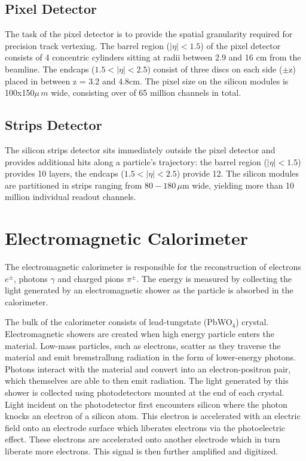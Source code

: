\subsection{Pixel Detector}

The task of the pixel detector is to provide the spatial granularity required for precision track vertexing. The barrel region ($|\eta|<1.5$) of the pixel detector consists of 4 concentric cylinders sitting at radii between 2.9 and 16 cm from the beamline. The endcaps ($1.5<|\eta|<2.5$) consist of three discs on each side ($\pm$z) placed in between z = 3.2 and 4.8cm. The pixel size on the silicon modules is 100x150$\mu\,m$ wide, consisting over of 65 million channels in total.

\subsection{Strips Detector}

The silicon strips detector sits immediately outside the pixel detector and provides additional hits along a particle's trajectory: the barrel region ($|\eta|<1.5$) provides 10 layers, the endcaps ($1.5<|\eta|<2.5$) provide 12. The silicon modules are partitioned in strips ranging from $80-180\,\mu$m wide, yielding more than 10 million individual readout channels.

\section{Electromagnetic Calorimeter}

The electromagnetic calorimeter is responsible for the reconstruction of electrons $e^{\pm}$, photons $\gamma$ and charged pions $\pi^{\pm}$. The energy is measured by collecting the light generated by an electromagnetic shower as the particle is absorbed in the calorimeter.\cite{ecaltdr}\cite{ecaltdradd}

The bulk of the calorimeter consists of lead-tungstate (PbWO$_{4}$) crystal. Electromagnetic showers are created when high energy particle enters the material. Low-mass particles, such as electrons, scatter as they traverse the material and emit bremstrallung radiation in the form of lower-energy photons. Photons interact with the material and convert into an electron-positron pair, which themselves are able to then emit radiation. The light generated by this shower is collected using photodetectors mounted at the end of each crystal. Light incident on the photodetector first encounters silicon where the photon knocks an electron of a silicon atom. This electron is accelerated with an electric field onto an electrode surface which liberates electrons via the photoelectric effect. These electrons are accelerated onto another electrode which in turn liberate more electrons. This signal is then further amplified and digitized.

